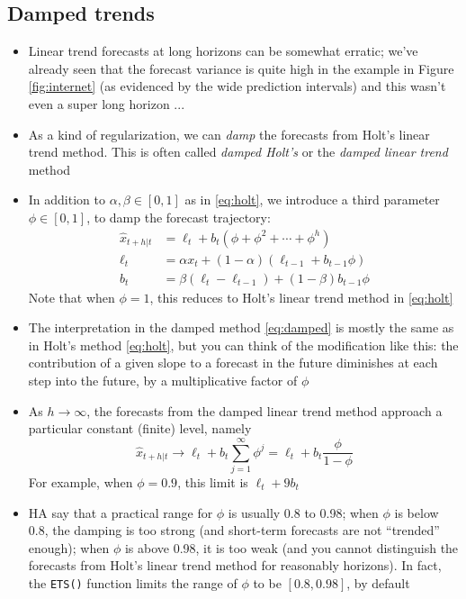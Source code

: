 \documentclass{article}
\begin{document}
\subsection{Damped trends}

\begin{itemize}
\item Linear trend forecasts at long horizons can be somewhat erratic; we've 
  already seen that the forecast variance is quite high in the example in Figure
  \ref{fig:internet} (as evidenced by the wide prediction intervals) and this
  wasn't even a super long horizon ...

\item As a kind of regularization, we can \emph{damp} the forecasts from
  Holt's linear trend method. This is often called \emph{damped Holt's} or the
  \emph{damped linear trend} method 

\item In addition to $\alpha,\beta \in [0,1]$ as in \eqref{eq:holt}, we
  introduce a third parameter $\phi \in [0,1]$, to damp the forecast
  trajectory: 
  \begin{equation}
  \label{eq:damped}
  \begin{aligned}
  \hat{x}_{t+h | t} &= \ell_t + b_t (\phi + \phi^2 + \cdots + \phi^h) \\ 
  \ell_t &= \alpha x_t + (1-\alpha) (\ell_{t-1} + b_{t-1} \phi) \\
  b_t &= \beta (\ell_t - \ell_{t-1}) + (1-\beta) b_{t-1} \phi
  \end{aligned}
  \end{equation}
  Note that when $\phi = 1$, this reduces to Holt's linear trend method in
  \eqref{eq:holt} 

\item The interpretation in the damped method \eqref{eq:damped} is mostly the
  same as in Holt's method \eqref{eq:holt}, but you can think of the
  modification like this: the contribution of a given slope to a forecast in the
  future diminishes at each step into the future, by a multiplicative factor of
  $\phi$   

\item As $h \to \infty$, the forecasts from the damped linear trend method
  approach a particular constant (finite) level, namely
  \[
  \hat{x}_{t+h | t} \to \ell_t + b_t \sum_{j=1}^\infty \phi^j = \ell_t + b_t
  \frac{\phi}{1-\phi} 
  \]
  For example, when $\phi = 0.9$, this limit is $\ell_t + 9 b_t$

\item HA say that a practical range for $\phi$ is usually 0.8 to 0.98; when
  $\phi$ is below 0.8, the damping is too strong (and short-term forecasts are
  not ``trended'' enough); when $\phi$ is above 0.98, it is too weak (and you
  cannot distinguish the forecasts from Holt's linear trend method for
  reasonably horizons). In fact, the \verb|ETS()| function limits the range of
  $\phi$ to be $[0.8, 0.98]$, by default


\end{itemize}
\end{document}
